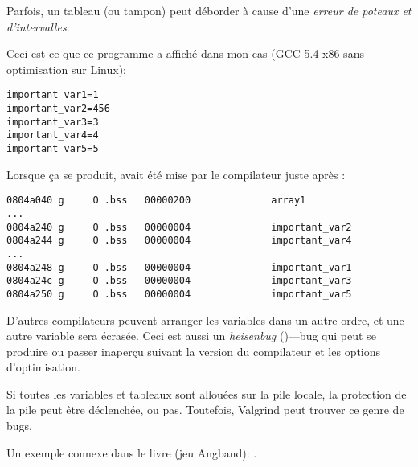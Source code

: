 \label{GlobalArraysOverflowHeisenbug}

Parfois, un tableau (ou tampon) peut déborder à cause d'une \emph{erreur de poteaux et d'intervalles}:



Ceci est ce que ce programme a affiché dans mon cas (GCC 5.4 x86 sans optimisation sur Linux):

\begin{lstlisting}
important_var1=1
important_var2=456
important_var3=3
important_var4=4
important_var5=5
\end{lstlisting}

Lorsque ça se produit,  avait été mise par le compilateur juste
après :

\begin{lstlisting}[caption=objdump -x]
0804a040 g     O .bss   00000200              array1
...
0804a240 g     O .bss   00000004              important_var2
0804a244 g     O .bss   00000004              important_var4
...
0804a248 g     O .bss   00000004              important_var1
0804a24c g     O .bss   00000004              important_var3
0804a250 g     O .bss   00000004              important_var5
\end{lstlisting}

D'autres compilateurs peuvent arranger les variables dans un autre ordre, et une autre
variable sera écrasée.
Ceci est aussi un \textit{heisenbug} ()---bug qui peut se produire
ou passer inaperçu suivant la version du compilateur et les options d'optimisation.

Si toutes les variables et tableaux sont allouées sur la pile locale, la protection
de la pile peut être déclenchée, ou pas.
Toutefois, Valgrind peut trouver ce genre de bugs.

Un exemple connexe dans le livre (jeu Angband): .

